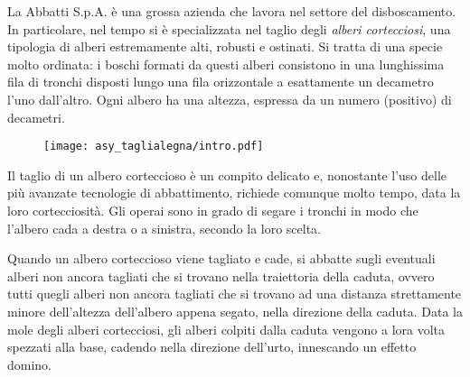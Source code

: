 \usepackage{tabularx}
\usepackage{pifont,mdframed}


\makeatletter
\gdef\this@inputfilename{input.txt}
\gdef\this@outputfilename{output.txt}
\makeatother

\newenvironment{warning}
  {\par\begin{mdframed}[linewidth=2pt,linecolor=gray]%
    \begin{list}{}{\leftmargin=1cm
                   \labelwidth=\leftmargin}\item[\Large\ding{43}]}
  {\end{list}\end{mdframed}\par}

\newcommand{\inputfile}{\texttt{input.txt}}
\newcommand{\outputfile}{\texttt{output.txt}}


La Abbatti S.p.A. è una grossa azienda che lavora nel settore del disboscamento. In particolare, nel tempo si è specializzata nel taglio degli \emph{alberi cortecciosi}, una tipologia di alberi estremamente alti, robusti e ostinati. Si tratta di una specie molto ordinata: i boschi formati da questi alberi consistono in una lunghissima fila di tronchi disposti lungo una fila orizzontale a esattamente un decametro l'uno dall'altro. Ogni albero ha una altezza, espressa da un numero (positivo) di decametri.

\begin{figure}[h!]
  \centering
    \texttt{[image: asy\_taglialegna/intro.pdf]}\\
\end{figure}

Il taglio di un albero corteccioso è un compito delicato e, nonostante l'uso delle più avanzate tecnologie di abbattimento, richiede comunque molto tempo, data la loro cortecciosità. Gli operai sono in grado di segare i tronchi in modo che l'albero cada a destra o a sinistra, secondo la loro scelta.

Quando un albero corteccioso viene tagliato e cade, si abbatte sugli eventuali alberi non ancora tagliati che si trovano nella traiettoria della caduta, ovvero tutti quegli alberi non ancora tagliati che si trovano ad una distanza strettamente minore dell'altezza dell'albero appena segato, nella direzione della caduta. Data la mole degli alberi cortecciosi, gli alberi colpiti dalla caduta vengono a lora volta spezzati alla base, cadendo nella direzione dell'urto, innescando un effetto domino.

